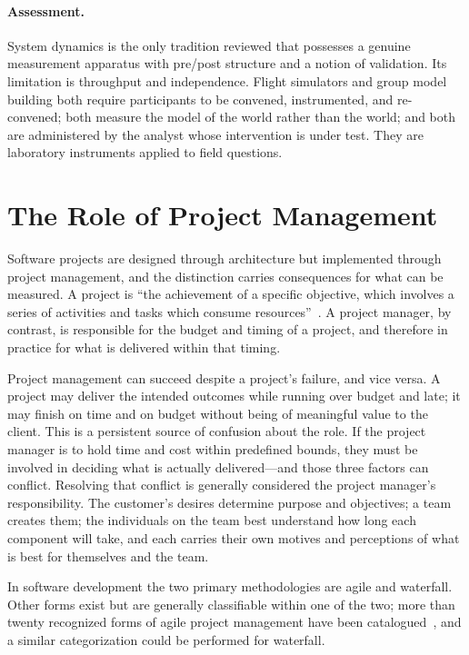 \documentclass[11pt,a4paper]{article}
\begin{document}
\paragraph{Assessment.} System dynamics is the only tradition reviewed that
possesses a genuine measurement apparatus with pre/post structure and a notion
of validation. Its limitation is throughput and independence. Flight simulators
and group model building both require participants to be convened, instrumented,
and re-convened; both measure the model of the world rather than the world; and
both are administered by the analyst whose intervention is under test. They are
laboratory instruments applied to field questions.

\section{The Role of Project Management}
\label{sec:pm}

Software projects are designed through architecture but implemented through
project management, and the distinction carries consequences for what can be
measured. A project is ``the achievement of a specific objective, which involves
a series of activities and tasks which consume resources''~\citep{munns1996}. A
project manager, by contrast, is responsible for the budget and timing of a
project, and therefore in practice for what is delivered within that timing.

Project management can succeed despite a project's failure, and vice versa. A
project may deliver the intended outcomes while running over budget and late; it
may finish on time and on budget without being of meaningful value to the
client. This is a persistent source of confusion about the role. If the project
manager is to hold time and cost within predefined bounds, they must be involved
in deciding what is actually delivered---and those three factors can conflict.
Resolving that conflict is generally considered the project manager's
responsibility. The customer's desires determine purpose and objectives; a team
creates them; the individuals on the team best understand how long each
component will take, and each carries their own motives and perceptions of what
is best for themselves and the team.

In software development the two primary methodologies are agile and waterfall.
Other forms exist but are generally classifiable within one of the two; more
than twenty recognized forms of agile project management have been
catalogued~\citep{rasnacis2017}, and a similar categorization could be performed
for waterfall.
\end{document}
